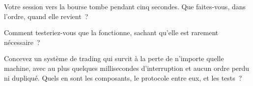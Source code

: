 \begin{interviewq}\label{iq:ll:resilience:4}
Votre session vers la bourse tombe pendant cinq secondes. Que faites-vous, dans l'ordre, quand elle revient~?
\end{interviewq}

\begin{interviewq}\label{iq:ll:resilience:5}
Comment testeriez-vous que la  fonctionne, sachant qu'elle est rarement nécessaire~?
\end{interviewq}

\begin{interviewq}\label{iq:ll:resilience:6}
Concevez un système de trading qui survit à la perte de n'importe quelle machine, avec au plus quelques millisecondes d'interruption et aucun
ordre perdu ni dupliqué. Quels en sont les composants, le protocole entre eux, et les tests~?
\end{interviewq}

